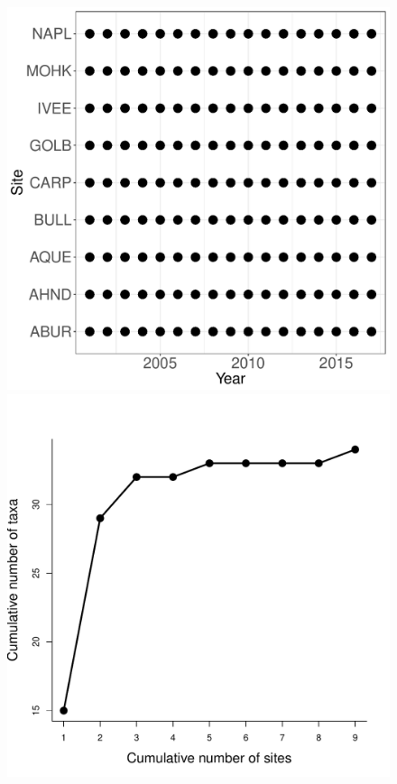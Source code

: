 \documentclass[11pt, oneside]{article}
\begin{document}
\begin{figure}[h!]
\includegraphics[scale = 0.4]{sbc-mobileInverts-castorani_spatiotemporal_sampling_effort.pdf}
\includegraphics[scale = 0.4]{sbc-mobileInverts-castorani_species_accumulation_space.pdf}

\end{figure}
\end{document}
